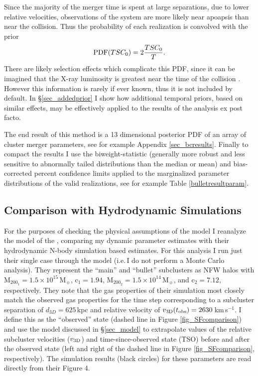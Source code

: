 \documentclass[12pt]{emulateapj}
\begin{document}
Since the majority of the merger time is spent at large separations, due to lower relative velocities, observations of the system are more likely near apoapsis than near the collision.  Thus the probability of each realization is convolved with the prior 
\begin{equation}
{\rm PDF}(TSC_0) = 2 \frac{TSC_0}{T}.
\label{eq_timeprior}
\end{equation}
There are likely selection effects which complicate this PDF, since it can be imagined that the X-ray luminosity is greatest near the time of the collision \citep[see e.g.][]{Randall:2002kk}.
However this information is rarely if ever known, thus it is not included by default.  In \S\ref{sec_addedprior} I show how additional temporal priors, based on similar effects, may be effectively applied to the results of the analysis ex post facto.

The end result of this method is a 13 dimensional posterior PDF of an array of cluster merger parameters, see for example Appendix \ref{sec_bcresults}.
Finally to compact the results I use the biweight-statistic (generally more robust and less sensitive to abnormally tailed distributions than the median or mean) and bias-corrected percent confidence limits \citep{Beers:1990kg} applied to the marginalized parameter distributions of the valid realizations, see for example Table \ref{bulletresultparam}.


\subsection{Comparison with Hydrodynamic Simulations} \label{sec_sfcomp}

For the purposes of checking the physical assumptions of the model I reanalyze the \citet{Springel:2007bg} model of the , comparing my dynamic parameter estimates with their hydrodynamic N-body simulation based estimates.
For this analysis I run just their single case through the model (i.e.\,I do not perform a Monte Carlo analysis).
They represent the ``main'' and ``bullet'' subclusters as NFW halos with  M$_{200_1} = 1.5\times 10^{15} $\,M$_\sun$, c$_1=1.94$, M$_{200_2} = 1.5\times 10^{14}$\,M$_\sun$, and c$_2=7.12$, respectively.
They note that the gas properties of their simulation most closely match the observed  gas properties for the time step corresponding to a subcluster separation of $d_{3D}=625$\,kpc and  relative velocity of $v_{\rm 3D}(t_{\rm obs})=2630$\,km\,s$^{-1}$.
I define this as the ``observed'' state (dashed line in Figure \ref{fig_SFcomparison}) and use the model discussed in \S \ref{sec_model} to extrapolate values of the relative subcluster velocities ($v_{\rm 3D}$) and time-since-observed state (TSO) before and after the observed state (left and right of the dashed line in Figure \ref{fig_SFcomparison}, respectively).
The \citet{Springel:2007bg} simulation results (black circles) for these parameters are read directly from their Figure 4.
\end{document}
